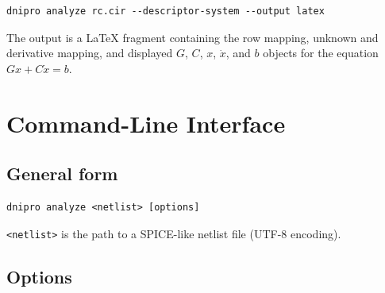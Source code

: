 \documentclass[11pt,a4paper]{article}
\newcommand{\code}[1]{\texttt{#1}}
\begin{document}
\begin{lstlisting}[style=shell]
dnipro analyze rc.cir --descriptor-system --output latex
\end{lstlisting}

The output is a \LaTeX{} fragment containing the row mapping, unknown and
derivative mapping, and displayed \(G\), \(C\), \(x\), \(\dot{x}\), and \(b\)
objects for the equation \(Gx + C\dot{x} = b\).

\section{Command-Line Interface}
\label{sec:cli}

\subsection{General form}

\begin{lstlisting}[style=shell]
dnipro analyze <netlist> [options]
\end{lstlisting}

\code{<netlist>} is the path to a SPICE-like netlist file (UTF-8 encoding).

\subsection{Options}
\end{document}
